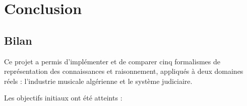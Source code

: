\chapter{Conclusion}

\section{Bilan}

Ce projet a permis d'implémenter et de comparer cinq formalismes de
représentation des connaissances et raisonnement, appliqués à deux domaines
réels : l'industrie musicale algérienne et le système judiciaire.

\medskip
\noindent Les objectifs initiaux ont été atteints :

